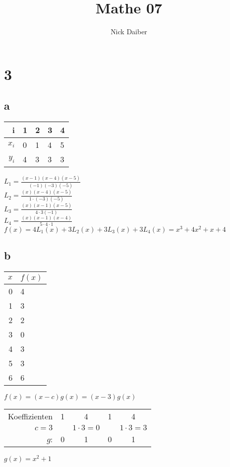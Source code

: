 \documentclass{article}
\author{Nick Daiber}
\title{Mathe 07}
\begin{document}
\maketitle
\section*{3}
\subsection*{a}
\begin{tabular}{r|llll}
    i&1&2&3&4\\
    \hline
    $x_i$&0&1&4&5\\
    $y_i$&4&3&3&3\\
\end{tabular}

$L_1 = \frac{(x-1)(x-4)(x-5)}{(-1)(-3)(-5)}$\\
$L_2 = \frac{(x)(x-4)(x-5)}{1\cdot(-3)(-5)}$\\
$L_3 = \frac{(x)(x-1)(x-5)}{4\cdot 3 (-1)}$\\
$L_4 = \frac{(x)(x-1)(x-4)}{5\cdot 4 \cdot 1}$\\
$f(x)= 4L_1(x) + 3L_2(x) + 3L_3(x) + 3L_4(x) = x^3+4x^2+x+4$
\subsection*{b}
\begin{tabular}{rl}
    $x$&$f(x)$\\
    \hline
    0&4\\
    1&3\\
    2&2\\
    3&0\\
    4&3\\
    5&3\\
    6&6
\end{tabular}

$f(x) = (x-c)g(x) = (x-3)g(x)$

\begin{tabular}{r|cccc}
    Koeffizienten&1&4&1&4\\
    $c=3$&&$1\cdot 3=0$&&$1\cdot 3 = 3$\\
    \hline
    $g$:&0&1&0&1
\end{tabular}

$g(x) = x^2+1$
\end{document}

